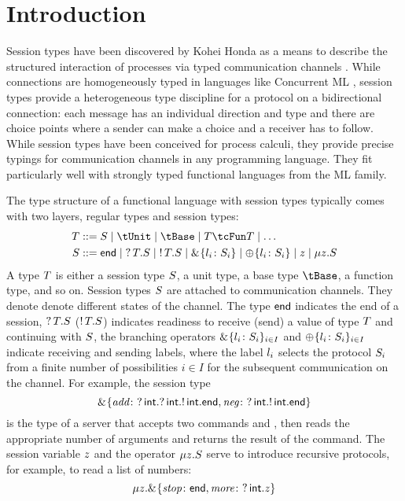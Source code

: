 
\section{Introduction}
\label{sec:introduction}

Session types have been discovered by Kohei Honda as a means to describe the structured
interaction of processes via typed communication channels
\cite{DBLP:conf/concur/Honda93,DBLP:conf/parle/TakeuchiHK94}. While connections are homogeneously
typed in languages like Concurrent ML
\cite{DBLP:conf/pldi/Reppy91}, 
session types provide a heterogeneous type discipline for a
protocol on a bidirectional connection: each message has an individual direction
and type and there are choice points where a sender can make a choice and a receiver
has to follow. 
While session types have been conceived for process
calculi, they provide precise typings for communication
channels in any programming language. They fit particularly well with
strongly typed functional languages from the ML family.

The type structure of a functional language with session types
typically comes with two layers, regular types and session types:
\begin{align}
    \TY & ::=  \SE \mid \tUnit \mid \tBase \mid \tFun\TY\TY \mid \dots
  \label{eq:3}\\\notag
    \SE & ::=  \End  \mid \sRecv\TY\SE \mid \sSend\TY\SE \mid
    \sRecvChoice{\cgAlt{\LL_i}{\SE_i}} \mid \sSendChoice{\cgAlt{\LL_i}{\SE_i}} \mid 
    \sVar \mid \sMu\sVar\SE
\end{align}
A type $T$ is either a session type $S$, a unit type, a base type $\tBase$,
a function type, and so on. Session types $S$ are attached to
communication channels. They denote denote different states of the
channel. The type $\mathsf{end}$ indicates the end of a session,
$\textup{?}\,T.S$ ($\textup{!}\,T.S$) indicates readiness to receive (send)
a value of type $T$ and continuing with $S$,  the branching
operators $\&^{{}}\{l_i\colon S_i\}_{i\in I}$ and
 $\oplus^{{}}\{l_i\colon S_i\}_{i\in I}$ indicate receiving and sending
labels, where the label $l_i$ selects the 
protocol $S_i$ from a finite number of possibilities $i\in I$ for the
subsequent communication on the channel. For example, the session type
\begin{displaymath}
  \&^{{}}\{
    \textit{add}\colon \textup{?}\,\mathsf{int}.\textup{?}\,\mathsf{int}.\textup{!}\,\mathsf{int}.\mathsf{end}
    ,
    \textit{neg}\colon \textup{?}\,\mathsf{int}.\textup{!}\,\mathsf{int}.\mathsf{end}
  \}
\end{displaymath}
is the type of a server that accepts two commands  and ,
then reads the appropriate number of arguments and returns the result of the command.
The session variable $z$ and the operator $\mu z.S$ serve to
introduce recursive protocols, for example, to read a list of numbers:
\begin{displaymath}
  \mu z. \&^{{}}\{
    \textit{stop}\colon \mathsf{end}
    ,
    \textit{more}\colon \textup{?}\,\mathsf{int}.z
  \}
\end{displaymath}

